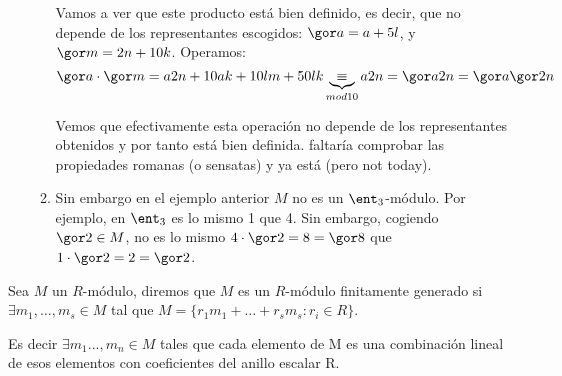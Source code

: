 \begin{example}
\begin{itemize}
\begin{enumerate}
		Vamos a ver que este producto está bien definido, es decir, que no depende de los representantes escogidos: $\cls{a}=a+5l$, y $\cls{m}=2n+10k$. Operamos:
		$$\cls{a}\cdot \cls{m}=a2n+10ak+10lm+50lk \underbrace{\equiv}_{mod 10} a2n=\cls{a2n}=\cls{a}\cls{2n}$$

		Vemos que efectivamente esta operación no depende de los representantes obtenidos y por tanto está bien definida. faltaría comprobar las propiedades romanas (o sensatas) y ya está (pero not today).
		\item Sin embargo en el ejemplo anterior $M$ no es un $\ent_3$-módulo. Por ejemplo, en $\ent_3$ es lo mismo 1 que 4. Sin embargo, cogiendo $\cls{2}\in M$, no es lo mismo $4\cdot\cls{2}=8=\cls{8}$ que $1\cdot\cls{2}=2=\cls{2}$.
	\end{enumerate}
	\end{itemize}
\end{example}

\begin{defn}\label{def:rmodulo_fg}
	Sea $M$ un $R$-módulo, diremos que $M$ es un $R$-módulo finitamente generado si $\exists m_1,\dots,m_s \in M$ tal que $M=\{r_1m_1+\dots+r_sm_s: r_i \in R \}$.

	Es decir $\exists m_1..., m_n \in M$ tales que cada elemento de M es una combinación lineal de esos elementos con coeficientes del anillo escalar R.
\end{defn}

